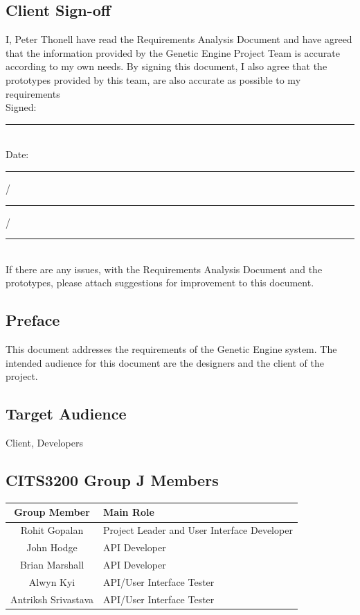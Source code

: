 \subsection*{Client Sign-off}
I, Peter Thonell have read the Requirements Analysis Document and have agreed that the information provided by the Genetic Engine Project Team is accurate according to my own needs. By signing this document, I also agree that the prototypes provided by this team, are also accurate as possible to my requirements
\\[10pt]
Signed: \rule{3cm}{.7pt}
\\[10pt]
Date: \rule{0.8cm}{.7pt} \slash \rule{0.8cm}{.7pt} \slash \rule{1.6cm}{.7pt}
\\[10pt]
If there are any issues, with the Requirements Analysis Document and the prototypes, please attach suggestions for improvement to this document.


\subsection*{Preface}
This document addresses the requirements of the Genetic Engine system. The intended audience for this document are the designers and the client of the project.

\subsection*{Target Audience}
Client, Developers

\subsection*{CITS3200 Group J Members}
\begin{tabular}{c l}
 Group Member & Main Role \\
 \hline \hline
 Rohit Gopalan & Project Leader and User Interface Developer \\ \hline
 John Hodge & API Developer \\ \hline
 Brian Marshall & API Developer \\ \hline
 Alwyn Kyi & API/User Interface Tester \\ \hline
 Antriksh Srivastava & API/User Interface Tester\\ \hline
\end{tabular}

